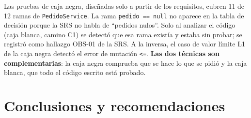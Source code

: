 \documentclass[11pt,a4paper,oneside]{report}
\newcommand{\code}[1]{\texttt{#1}}
\begin{document}
\begin{idea}[Hallazgo]
Las pruebas de caja negra, diseñadas solo a partir de los requisitos, cubren 11 de 12 ramas de \code{PedidoService}. La rama \code{pedido == null} no aparece en la tabla de decisión porque la SRS no habla de ``pedidos nulos''. Solo al analizar el código (caja blanca, camino C1) se detectó que esa rama existía y estaba sin probar; se registró como hallazgo OBS-01 de la SRS. A la inversa, el caso de valor límite L1 de la caja negra detectó el error de mutación \code{<=}. \textbf{Las dos técnicas son complementarias}: la caja negra comprueba que se hace lo que se pidió y la caja blanca, que todo el código escrito está probado.
\end{idea}

\chapter{Conclusiones y recomendaciones}
\end{document}

